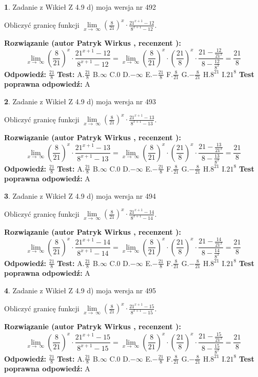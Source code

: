 \documentclass[12pt, a4paper]{article}
\theoremstyle{definition} %
\newtheorem{zad}{}
\newcommand{\zadStart}[1]{\begin{zad}#1\newline}
\newcommand{\zadStop}{\end{zad}}
\newcommand{\rozwStart}[2]{\noindent \textbf{Rozwiązanie (autor #1 , recenzent #2): }\newline}
\newcommand{\rozwStop}{\newline}
\newcommand{\odpStart}{\noindent \textbf{Odpowiedź:}\newline}
\newcommand{\odpStop}{\newline}
\newcommand{\testStart}{\noindent \textbf{Test:}\newline}
\newcommand{\testStop}{\newline}
\newcommand{\kluczStart}{\noindent \textbf{Test poprawna odpowiedź:}\newline}
\newcommand{\kluczStop}{\newline}
\begin{document}
\zadStart{Zadanie z Wikieł Z 4.9 d) moja wersja nr 492}


Obliczyć granicę funkcji  $\lim\limits_{x\to\ \infty}(\frac{8}{21})^{x}\cdot\frac{21^{x+1}-12}{8^{x+1}-12}$.
\zadStop
\rozwStart{Patryk Wirkus}{}
$$\lim\limits_{x\to\ \infty}(\frac{8}{21})^{x}\cdot\frac{21^{x+1}-12}{8^{x+1}-12}=\lim\limits_{x\to\ \infty}(\frac{8}{21})^{x}\cdot(\frac{21}{8})^{x} \cdot \frac{21-\frac{12}{21^{x}}}{8-\frac{12}{8^{x}}} = \frac{21}{8}$$
\rozwStop
\odpStart
$\frac{21}{8}$
\odpStop
\testStart
A.$\frac{21}{8}$ B.$\infty$ C.$0$ D.$-\infty$ E.$-\frac{21}{8}$
F.$\frac{8}{21}$ G.$-\frac{8}{21}$
H.$8^{21}$
I.$21^{8}$
\testStop
\kluczStart
A
\kluczStop



\zadStart{Zadanie z Wikieł Z 4.9 d) moja wersja nr 493}


Obliczyć granicę funkcji  $\lim\limits_{x\to\ \infty}(\frac{8}{21})^{x}\cdot\frac{21^{x+1}-13}{8^{x+1}-13}$.
\zadStop
\rozwStart{Patryk Wirkus}{}
$$\lim\limits_{x\to\ \infty}(\frac{8}{21})^{x}\cdot\frac{21^{x+1}-13}{8^{x+1}-13}=\lim\limits_{x\to\ \infty}(\frac{8}{21})^{x}\cdot(\frac{21}{8})^{x} \cdot \frac{21-\frac{13}{21^{x}}}{8-\frac{13}{8^{x}}} = \frac{21}{8}$$
\rozwStop
\odpStart
$\frac{21}{8}$
\odpStop
\testStart
A.$\frac{21}{8}$ B.$\infty$ C.$0$ D.$-\infty$ E.$-\frac{21}{8}$
F.$\frac{8}{21}$ G.$-\frac{8}{21}$
H.$8^{21}$
I.$21^{8}$
\testStop
\kluczStart
A
\kluczStop



\zadStart{Zadanie z Wikieł Z 4.9 d) moja wersja nr 494}


Obliczyć granicę funkcji  $\lim\limits_{x\to\ \infty}(\frac{8}{21})^{x}\cdot\frac{21^{x+1}-14}{8^{x+1}-14}$.
\zadStop
\rozwStart{Patryk Wirkus}{}
$$\lim\limits_{x\to\ \infty}(\frac{8}{21})^{x}\cdot\frac{21^{x+1}-14}{8^{x+1}-14}=\lim\limits_{x\to\ \infty}(\frac{8}{21})^{x}\cdot(\frac{21}{8})^{x} \cdot \frac{21-\frac{14}{21^{x}}}{8-\frac{14}{8^{x}}} = \frac{21}{8}$$
\rozwStop
\odpStart
$\frac{21}{8}$
\odpStop
\testStart
A.$\frac{21}{8}$ B.$\infty$ C.$0$ D.$-\infty$ E.$-\frac{21}{8}$
F.$\frac{8}{21}$ G.$-\frac{8}{21}$
H.$8^{21}$
I.$21^{8}$
\testStop
\kluczStart
A
\kluczStop



\zadStart{Zadanie z Wikieł Z 4.9 d) moja wersja nr 495}


Obliczyć granicę funkcji  $\lim\limits_{x\to\ \infty}(\frac{8}{21})^{x}\cdot\frac{21^{x+1}-15}{8^{x+1}-15}$.
\zadStop
\rozwStart{Patryk Wirkus}{}
$$\lim\limits_{x\to\ \infty}(\frac{8}{21})^{x}\cdot\frac{21^{x+1}-15}{8^{x+1}-15}=\lim\limits_{x\to\ \infty}(\frac{8}{21})^{x}\cdot(\frac{21}{8})^{x} \cdot \frac{21-\frac{15}{21^{x}}}{8-\frac{15}{8^{x}}} = \frac{21}{8}$$
\rozwStop
\odpStart
$\frac{21}{8}$
\odpStop
\testStart
A.$\frac{21}{8}$ B.$\infty$ C.$0$ D.$-\infty$ E.$-\frac{21}{8}$
F.$\frac{8}{21}$ G.$-\frac{8}{21}$
H.$8^{21}$
I.$21^{8}$
\testStop
\kluczStart
A
\kluczStop
\end{document}
